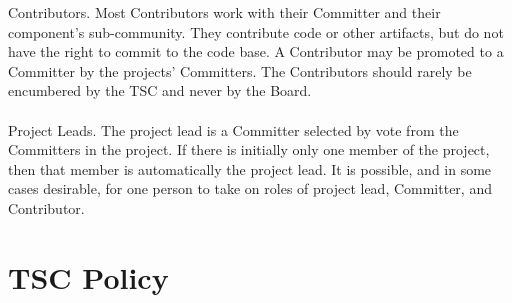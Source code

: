 \documentclass[a4paper, 12pt]{book}
\begin{document}
Contributors.  Most Contributors work with their Committer and their component’s sub-community. They contribute code or other artifacts, but do not have the right to commit to the code base.  A Contributor may be promoted to a Committer by the projects’ Committers.  The Contributors should rarely be encumbered by the TSC and never by the Board.\\
\\
Project Leads.  The project lead is a Committer selected by vote from the Committers in the project.  If there is initially only one member of the project, then that member is automatically the project lead.  It is possible, and in some cases desirable, for one person to take on roles of project lead, Committer, and Contributor.

\chapter{TSC Policy}
\label{chap:appendix_policy}
\end{document}

